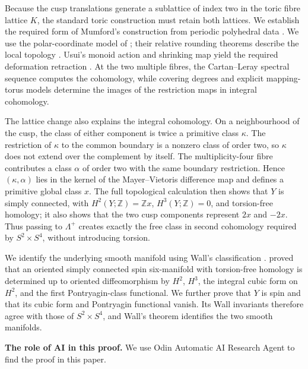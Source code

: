 \documentclass[11pt]{article}
\theoremstyle{definition}
\theoremstyle{remark}
\numberwithin{equation}{section}
\begin{document}
Because the cusp translations generate a sublattice of index two in the
toric fibre lattice $K$, the standard toric construction must retain both
lattices.  We establish the required form of Mumford's construction
from periodic polyhedral data
\citep[Sections~2--3 and~6, especially Corollary~6.6]{Mumford1972}.
We use the polar-coordinate model of
\citet[Proposition~3.1]{NakayamaOgus2010}; their relative rounding theorems
describe the local topology
\citep[Theorems~3.7 and~5.1]{NakayamaOgus2010}.  Usui's monoid action and
shrinking map yield the required deformation retraction
\citep[Theorem~5.2]{Usui2001}.  At the two multiple fibres, the Cartan--Leray
spectral sequence computes the cohomology, while covering degrees and
explicit mapping-torus models determine the images of the restriction maps
in integral cohomology.

The lattice change also explains the integral cohomology.  On a neighbourhood
of the cusp, the class of either component is twice a primitive class
$\kappa$.  The restriction of $\kappa$ to the common boundary is a
nonzero class of order two, so $\kappa$ does not extend over the complement
by itself.  The multiplicity-four fibre contributes a class $\alpha$ of
order two with the same boundary restriction.  Hence
$(\kappa,\alpha)$ lies in the kernel of the Mayer--Vietoris difference map
and defines a primitive global class $x$.  The full topological calculation
then shows
that $Y$ is simply connected, with $H^2(Y;\mathbb Z)=\mathbb Zx$,
$H^3(Y;\mathbb Z)=0$, and torsion-free homology; it also shows that the two
cusp components represent $2x$ and $-2x$.  Thus passing to
$\Lambda^+$ creates exactly the free class in second cohomology required by
$S^2\times S^4$, without introducing torsion.

We identify the underlying smooth manifold using Wall's classification \citep{Wall1966}.
\citet[Theorem~5]{Wall1966} proved
that an oriented simply connected spin six-manifold with torsion-free
homology is determined up to oriented diffeomorphism by $H^2$, $H^3$, the
integral cubic form on $H^2$, and the first Pontryagin-class functional.  We further prove that $Y$ is spin and that its
cubic form and Pontryagin functional vanish.  Its Wall invariants therefore
agree with those of $S^2\times S^4$, and Wall's theorem identifies the two
smooth manifolds.

\vspace{3pt}

\noindent\textbf{The role of AI in this proof.} We use
Odin Automatic AI Research Agent to find the proof in this paper.
\end{document}
